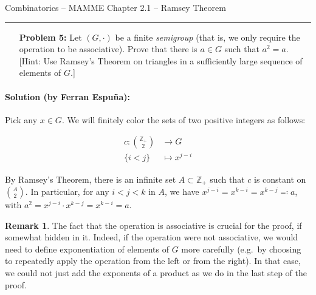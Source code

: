 \documentclass{amsart}
\theoremstyle{plain}
\theoremstyle{definition}
\newtheorem{rk}{\textbf{Remark}}
\begin{document}
    {\Large Combinatorics -- MAMME}
    {\Large Chapter 2.1 -- Ramsey Theorem}

    \vspace{0.5cm}

    \hrule

    \vspace{0.5cm}

    \begin{enumerate}


    \item[\textbf{Problem 5:}] Let $(G, \cdot)$ be a finite \emph{semigroup} (that is, we only require the operation to be associative).
    Prove that there is $a \in G$ such that $a^2 = a$.
    [Hint: Use Ramsey's Theorem on triangles in a sufficiently large sequence of elements of $G$.]
    \end{enumerate}

    \paragraph{\textbf{Solution (by Ferran Espuña):}} Pick any $x \in G$.
    We will finitely color the sets of two positive integers as follows:

    \begin{align*}
        c: \binom{\mathbb{Z}_+}{2} & \longrightarrow G \\
        \{i < j\} & \longmapsto x^{j-i}
    \end{align*}

    \noindent By Ramsey's Theorem, there is an infinite set $A \subset \mathbb{Z}_+$ such that $c$ is constant on $\binom{A}{2}$.
    In particular, for any $i < j < k$ in $A$, we have $x^{j-i} = x^{k-i} = x^{k-j} \eqqcolon a$,
    with $a^2 = x^{j-i} \cdot x^{k-j} = x^{k-i} = a$.

    \begin{rk}
        The fact that the operation is associative is crucial for the proof, if somewhat hidden in it.
        Indeed, if the operation were not associative, we would need to define exponentiation of elements of $G$ more carefully
        (e.g.\ by choosing to repeatedly apply the operation from the left or from the right).
        In that case, we could not just add the exponents of a product as we do in the last step of the proof.

    \end{rk}
\end{document}
